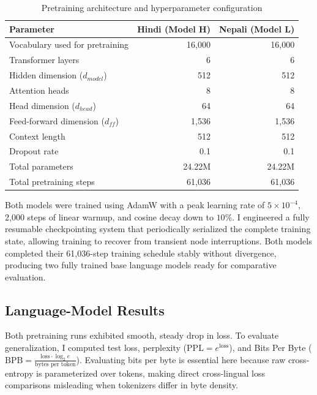 \documentclass[11pt,a4paper]{article}
\begin{document}
\begin{table}[htbp]
\centering
\caption{Pretraining architecture and hyperparameter configuration}
\begin{tabular}{p{5.5cm}rr}
\toprule
\textbf{Parameter} & \textbf{Hindi (Model H)} & \textbf{Nepali (Model L)} \\
\midrule
Vocabulary used for pretraining & 16,000 & 16,000 \\
Transformer layers & 6 & 6 \\
Hidden dimension ($d_{model}$) & 512 & 512 \\
Attention heads & 8 & 8 \\
Head dimension ($d_{head}$) & 64 & 64 \\
Feed-forward dimension ($d_{ff}$) & 1,536 & 1,536 \\
Context length & 512 & 512 \\
Dropout rate & 0.1 & 0.1 \\
Total parameters & 24.22M & 24.22M \\
Total pretraining steps & 61,036 & 61,036 \\
\bottomrule
\end{tabular}
\end{table}

Both models were trained using AdamW with a peak learning rate of $5 \times 10^{-4}$, 2,000 steps of linear warmup, and cosine decay down to $10\%$. I engineered a fully resumable checkpointing system that periodically serialized the complete training state, allowing training to recover from transient node interruptions. Both models completed their 61,036-step training schedule stably without divergence, producing two fully trained base language models ready for comparative evaluation.

\subsection{Language-Model Results}

Both pretraining runs exhibited smooth, steady drop in loss. To evaluate generalization, I computed test loss, perplexity ($\mathrm{PPL} = e^{\mathrm{loss}}$), and Bits Per Byte ($\mathrm{BPB} = \frac{\mathrm{loss} \cdot \log_2 e}{\text{bytes per token}}$). Evaluating bits per byte is essential here because raw cross-entropy is parameterized over tokens, making direct cross-lingual loss comparisons misleading when tokenizers differ in byte density.
\end{document}
